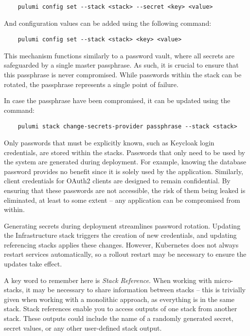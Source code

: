 \begin{verbatim}
    pulumi config set --stack <stack> --secret <key> <value>
\end{verbatim}

And configuration values can be added using the following command:

\begin{verbatim}
    pulumi config set --stack <stack> <key> <value>
\end{verbatim}

This mechanism functions similarly to a password vault, where all secrets are safeguarded by a single master passphrase. As such, it is crucial to ensure that this passphrase is never compromised. While passwords within the stack can be rotated, the passphrase represents a single point of failure.

In case the passphrase have been compromised, it can be updated using the command:

\begin{verbatim}
    pulumi stack change-secrets-provider passphrase --stack <stack>
\end{verbatim}

Only passwords that must be explicitly known, such as Keycloak login credentials, are stored within the stacks. Passwords that only need to be used by the system are generated during deployment. For example, knowing the database password provides no benefit since it is solely used by the application. Similarly, client credentials for OAuth2 clients are designed to remain confidential. By ensuring that these passwords are not accessible, the risk of them being leaked is eliminated, at least to some extent -- any application can be compromised from within.

Generating secrets during deployment streamlines password rotation. Updating the Infrastructure stack triggers the creation of new credentials, and updating referencing stacks applies these changes. However, Kubernetes does not always restart services automatically, so a rollout restart may be necessary to ensure the updates take effect.

A key word to remember here is \textit{Stack Reference}. When working with micro-stacks, it may be necessary to share information between stacks -- this is trivially given when working with a monolithic approach, as everything is in the same stack. Stack references enable you to access outputs of one stack from another stack. These outputs could include the name of a randomly generated secret, secret values, or any other user-defined stack output.

